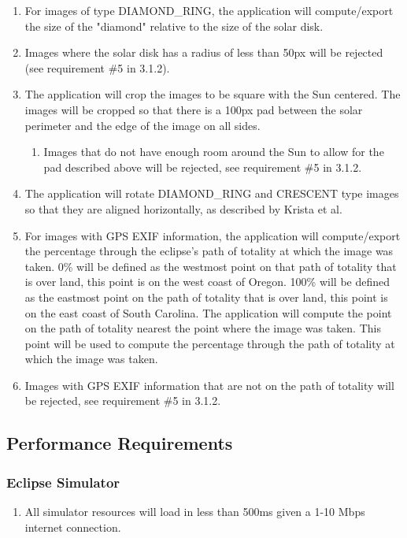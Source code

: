 \documentclass[10pt, onecolumn, draftclsnofoot, letterpaper, compsoc]{IEEEtran}
\begin{document}
\begin{enumerate}
		\item For images of type DIAMOND\_RING, the application will 
		compute/export the size of the "diamond" relative to the size of 
		the solar disk.

		\item Images where the solar disk has a radius of less than 50px
		will be rejected (see requirement \#5 in 3.1.2).

		\item The application will crop the images to be square with the 
		Sun centered. The images will be cropped so that there is a 100px
		pad between the solar perimeter and the edge of the image on all 
		sides.
		\begin{enumerate}
			\item Images that do not have enough room around the Sun to 
			allow for the pad described above will be rejected, see requirement \#5 in 3.1.2.
		\end{enumerate}

		\item The application will rotate DIAMOND\_RING and CRESCENT type 
		images so that they are aligned horizontally, as described by 
		Krista et al.

		\item For images with GPS EXIF information, the application will 
		compute/export the percentage through the eclipse's path of 
		totality at which the image was taken. 0\% will be defined as the 
		westmost point on that path of totality that is over land, this 
		point is on the west coast of Oregon. 100\% will be defined as the 
		eastmost point on the path of totality that is over land, this 
		point is on the east coast of South Carolina. The application will
		compute the point on the path of totality nearest the point where 
		the image was taken. This point will be used to compute the 
		percentage through the path of totality at which the image was 
		taken.

		\item Images with GPS EXIF information that are not on the path of
		totality will be rejected, see requirement \#5 in 3.1.2.

	\end{enumerate}

\subsection{Performance Requirements}

\subsubsection{Eclipse Simulator}
	\begin{enumerate}
		\item All simulator resources will load in less than 500ms given a 1-10
		 Mbps internet connection.
	\end{enumerate}
\end{document}

